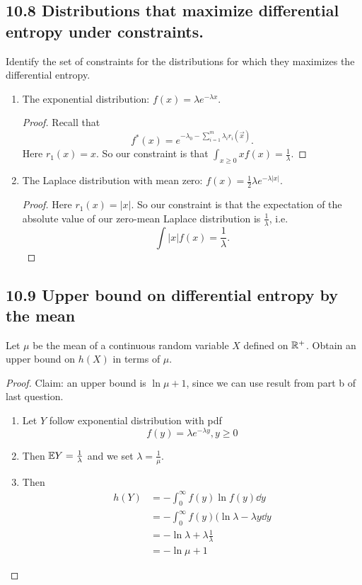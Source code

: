 \documentclass[../main.tex]{subfiles}
\begin{document}
\subsection*{10.8 Distributions that maximize differential entropy under constraints.}
Identify the set of constraints for the distributions for which they maximizes the differential entropy.
\begin{enumerate}
    \item The exponential distribution: $f(x)=\lambda e^{-\lambda x}$. 
    \begin{proof}
        Recall that \[
        f^*(x) = e^{-\lambda_0 - \sum_{i=1}^m \lambda_i r_i(\vec x)}.
        \]
        Here $r_1(x)=x$. So our constraint is that $\int_{x\geq 0} x f(x) = \frac{1}{\lambda}$.
    \end{proof}
    \item The Laplace distribution with mean zero: $f(x)=\frac{1}{2}\lambda e^{-\lambda|x|}$.
    \begin{proof}
        Here $r_1(x)=|x|$. So our constraint is that the expectation of the absolute value of our zero-mean Laplace distribution is $\frac{1}{\lambda}$, i.e. \[
        \int |x| f(x) = \frac{1}{\lambda}.
        \]
    \end{proof}
\end{enumerate}
\subsection*{10.9 Upper bound on differential entropy by the mean}
Let $\mu$ be the mean of a continuous random variable $X$ defined on $\mathbb{R}^+$. Obtain an upper bound on $h(X)$ in terms of $\mu$.
\begin{proof}

    Claim: an upper bound is $\ln \mu + 1$, since we can use result from part b of last question.
    \begin{enumerate}
        \item Let $Y$ follow exponential distribution with pdf \[
        f(y) = \lambda e^{-\lambda y}, y\geq 0
        \]
        \item Then $\mathbb{E} Y = \frac{1}{\lambda}$ and we set $\lambda = \frac{1}{\mu}$. 
        \item Then \begin{align*}
            h(Y) &= -\int_0^\infty f(y)\ln f(y) \dd y\\
            &=-\int_0^\infty f(y)(\ln \lambda - \lambda y \dd y\\
            &= -\ln \lambda + \lambda \frac{1}{\lambda}\\
            &= -\ln \mu + 1
        \end{align*}
    \end{enumerate}
\end{proof}
\end{document}
